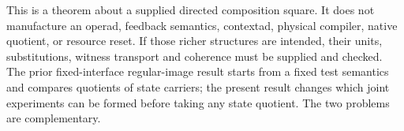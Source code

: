This is a theorem about a supplied directed composition square. It does
not manufacture an operad, feedback semantics, contextad, physical
compiler, native quotient, or resource reset. If those richer structures
are intended, their units, substitutions, witness transport and coherence
must be supplied and checked. The prior fixed-interface regular-image
result starts from a fixed test semantics and compares quotients of state
carriers; the present result changes which joint experiments can be formed
before taking any state quotient. The two problems are complementary.

